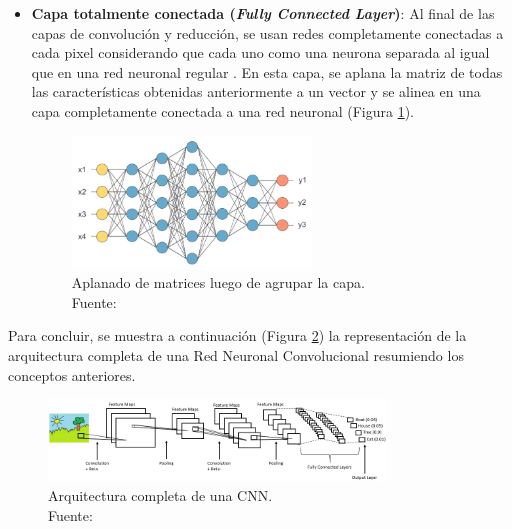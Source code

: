 \begin{itemize}
\begin{itemize}
\begin{itemize}
			\item \textbf{Capa totalmente conectada (\textit{Fully Connected Layer})}: Al final de las capas de convolución y reducción, se usan redes completamente conectadas a cada pixel considerando que cada uno como una neurona separada al igual que en una red neuronal regular \parencite{tec_lopez2016cnnTF}. En esta capa, se aplana la matriz de todas las características obtenidas anteriormente a un vector y se alinea en una capa completamente conectada a una red neuronal (Figura \ref{2:fig32}).
			\begin{figure}[h]
				\begin{center}
					\includegraphics[width=0.60\textwidth]{2/figures/fully_conected_cnn.jpg}
					\caption[Aplanado de matrices luego de agrupar la capa]{Aplanado de matrices luego de agrupar la capa.\\
					Fuente: \cite{tec_prabhu2018cnn}}
					\label{2:fig32}
				\end{center}
			\end{figure}
		\end{itemize}
		Para concluir, se muestra a continuación (Figura \ref{2:fig33}) la representación de la arquitectura completa de una Red Neuronal Convolucional resumiendo los conceptos anteriores.
		\begin{figure}[h]
			\begin{center}
				\includegraphics[width=0.8\textwidth]{2/figures/arquitectura_cnn.jpg}
				\caption[Arquitectura completa de una CNN]{Arquitectura completa de una CNN.\\
				Fuente: \cite{tec_prabhu2018cnn}}
				\label{2:fig33}
			\end{center}
		\end{figure}
		

\end{itemize}
\end{itemize}
